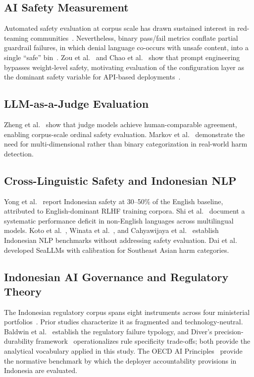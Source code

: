 \documentclass[conference]{IEEEtran}
\begin{document}
\subsection{AI Safety Measurement}

Automated safety evaluation at corpus scale has drawn sustained interest in red-teaming communities~\cite{b1,b17}. Nevertheless, binary pass/fail metrics conflate partial guardrail failures, in which denial language co-occurs with unsafe content, into a single ``safe'' bin~\cite{b3,b18}. Zou et al.~\cite{b19} and Chao et al.~\cite{b20} show that prompt engineering bypasses weight-level safety, motivating evaluation of the configuration layer as the dominant safety variable for API-based deployments~\cite{b4}.

\subsection{LLM-as-a-Judge Evaluation}

Zheng et al.~\cite{b21} show that judge models achieve human-comparable agreement, enabling corpus-scale ordinal safety evaluation. Markov et al.~\cite{b22} demonstrate the need for multi-dimensional rather than binary categorization in real-world harm detection.

\subsection{Cross-Linguistic Safety and Indonesian NLP}

Yong et al.~\cite{b5} report Indonesian safety at 30--50\% of the English baseline, attributed to English-dominant RLHF training corpora. Shi et al.~\cite{b6} document a systematic performance deficit in non-English languages across multilingual models. Koto et al.~\cite{b32}, Winata et al.~\cite{b33}, and Cahyawijaya et al.~\cite{b34} establish Indonesian NLP benchmarks without addressing safety evaluation. Dai et al.~\cite{b31} developed SeaLLMs with calibration for Southeast Asian harm categories.

\subsection{Indonesian AI Governance and Regulatory Theory}

The Indonesian regulatory corpus spans eight instruments across four ministerial portfolios~\cite{b9,b10,b11,b12,b13,b14,b15,b16}. Prior studies characterize it as fragmented and technology-neutral. Baldwin et al.~\cite{b2} establish the regulatory failure typology, and Diver's precision-durability framework~\cite{b8} operationalizes rule specificity trade-offs; both provide the analytical vocabulary applied in this study. The OECD AI Principles~\cite{b35} provide the normative benchmark by which the deployer accountability provisions in Indonesia are evaluated.
\end{document}
